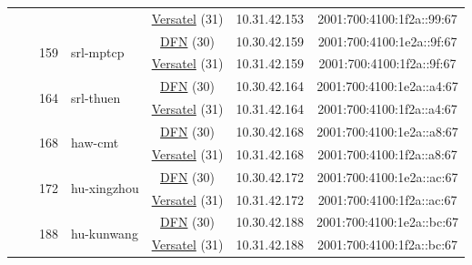 \begin{small}
\begin{center}
\begin{longtable}{|c|c|c|c|c|c|c|c|}
  &  &  &  & \multicolumn{2}{|c|}{\tiny{\href{http://www.versatel.de}{Versatel} (31)}} & \tiny{10.31.42.153} & \tiny{2001:700:4100:1f2a::99:67} \\* \cline{3-3}\cline{4-4}\cline{5-5}\cline{6-6}\cline{7-7}\cline{8-8}
  &  & \multirow{2}{*}{\tiny{159}} & \multicolumn{1}{|l|}{\multirow{2}{*}{\tiny{srl-mptcp}}} & \multicolumn{2}{|c|}{\tiny{\href{https://www.dfn.de}{DFN} (30)}} & \tiny{10.30.42.159} & \tiny{2001:700:4100:1e2a::9f:67} \\* \cline{5-5}\cline{6-6}\cline{7-7}\cline{8-8}
  &  &  &  & \multicolumn{2}{|c|}{\tiny{\href{http://www.versatel.de}{Versatel} (31)}} & \tiny{10.31.42.159} & \tiny{2001:700:4100:1f2a::9f:67} \\* \cline{3-3}\cline{4-4}\cline{5-5}\cline{6-6}\cline{7-7}\cline{8-8}
  &  & \multirow{2}{*}{\tiny{164}} & \multicolumn{1}{|l|}{\multirow{2}{*}{\tiny{srl-thuen}}} & \multicolumn{2}{|c|}{\tiny{\href{https://www.dfn.de}{DFN} (30)}} & \tiny{10.30.42.164} & \tiny{2001:700:4100:1e2a::a4:67} \\* \cline{5-5}\cline{6-6}\cline{7-7}\cline{8-8}
  &  &  &  & \multicolumn{2}{|c|}{\tiny{\href{http://www.versatel.de}{Versatel} (31)}} & \tiny{10.31.42.164} & \tiny{2001:700:4100:1f2a::a4:67} \\* \cline{3-3}\cline{4-4}\cline{5-5}\cline{6-6}\cline{7-7}\cline{8-8}
  &  & \multirow{2}{*}{\tiny{168}} & \multicolumn{1}{|l|}{\multirow{2}{*}{\tiny{haw-cmt}}} & \multicolumn{2}{|c|}{\tiny{\href{https://www.dfn.de}{DFN} (30)}} & \tiny{10.30.42.168} & \tiny{2001:700:4100:1e2a::a8:67} \\* \cline{5-5}\cline{6-6}\cline{7-7}\cline{8-8}
  &  &  &  & \multicolumn{2}{|c|}{\tiny{\href{http://www.versatel.de}{Versatel} (31)}} & \tiny{10.31.42.168} & \tiny{2001:700:4100:1f2a::a8:67} \\* \cline{3-3}\cline{4-4}\cline{5-5}\cline{6-6}\cline{7-7}\cline{8-8}
  &  & \multirow{2}{*}{\tiny{172}} & \multicolumn{1}{|l|}{\multirow{2}{*}{\tiny{hu-xingzhou}}} & \multicolumn{2}{|c|}{\tiny{\href{https://www.dfn.de}{DFN} (30)}} & \tiny{10.30.42.172} & \tiny{2001:700:4100:1e2a::ac:67} \\* \cline{5-5}\cline{6-6}\cline{7-7}\cline{8-8}
  &  &  &  & \multicolumn{2}{|c|}{\tiny{\href{http://www.versatel.de}{Versatel} (31)}} & \tiny{10.31.42.172} & \tiny{2001:700:4100:1f2a::ac:67} \\* \cline{3-3}\cline{4-4}\cline{5-5}\cline{6-6}\cline{7-7}\cline{8-8}
  &  & \multirow{2}{*}{\tiny{188}} & \multicolumn{1}{|l|}{\multirow{2}{*}{\tiny{hu-kunwang}}} & \multicolumn{2}{|c|}{\tiny{\href{https://www.dfn.de}{DFN} (30)}} & \tiny{10.30.42.188} & \tiny{2001:700:4100:1e2a::bc:67} \\* \cline{5-5}\cline{6-6}\cline{7-7}\cline{8-8}
  &  &  &  & \multicolumn{2}{|c|}{\tiny{\href{http://www.versatel.de}{Versatel} (31)}} & \tiny{10.31.42.188} & \tiny{2001:700:4100:1f2a::bc:67} \\ \hline
\end{longtable}
\end{center}
\end{small}



